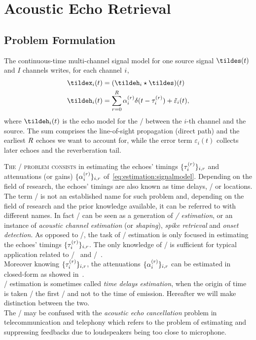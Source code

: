\chapter{Acoustic Echo Retrieval}\label{ch:estimation}
\vspace{-2.5em}
\synopsisChEstimation

\section{Problem Formulation}\label{sec:estimation:problem}
The continuous-time multi-channel signal model for one source signal $\tildes(t)$ and $I$ channels writes, for each channel $i$,
\begin{equation}\label{eq:estimation:signalmodel}
    \begin{aligned}
        \tildex_i(t) &= (\tildeh_i \convCont \tildes)(t) \\
        \tildeh_i(t) &= \echoModelTimeSimple{i} + \tilde{\varepsilon}_i(t),
    \end{aligned}
\end{equation}
where $\tildeh_i(t)$ is the echo model for the \RIR/ between the $i$-th channel and the source.
The sum comprises the line-of-sight propagation (direct path) and the earliest $R$ echoes we want to account for, while the error term $\varepsilon_i(t)$ collects later echoes and the reverberation tail.

\mynewline
\textsc{The \AERdef/ problem consists} in estimating the echoes' timings $\{\tau_{i}^{(r)}\}_{i,r}$ and attenuations (or gains) $\{\alpha_{i}^{(r)}\}_{i,r}$ of~\cref{eq:estimation:signalmodel}.
Depending on the field of research, the echoes' timings are also known as time delays, \TOAdef/ or locations.
\\The term \AER/ is not an established name for such problem and, depending on the field of research and the prior knowledge available, it can be referred to with different names.
In fact \AER/ can be seen as a generation of \textit{\TOAs/ estimation}, or an instance of \textit{acoustic channel estimation} (or \textit{shaping}), \textit{spike retrieval} and \textit{onset detection}.
As opposed to \AER/, the task of \TOAs/ estimation is only focused in estimating the echoes' timings $\{\tau_{i}^{(r)}\}_{i,r}$.
The only knowledge of \TOAs/ is sufficient for typical application related to \SSL/~ and \RooGE/~.
\\Moreover knowing $\{\tau_{i}^{(r)}\}_{i,r}$, the attenuations $\{\alpha_{i}^{(r)}\}_{i,r}$ can be estimated in closed-form as showed in~.
\\\TOAs/ estimation is sometimes called \textit{time delays estimation}, when the origin of time is taken \wrt/ the first \TOA/ and not to the time of emission.
Hereafter we will make distinction between the two.
\\The \AER/ may be confused with the \textit{acoustic echo cancellation} problem in telecommunication and telephony which refers to the problem of estimating and suppressing feedbacks due to loudspeakers being too close to microphone.

